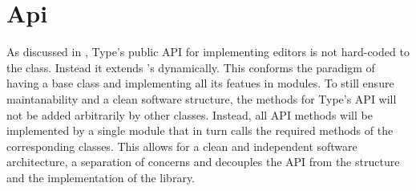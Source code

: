 




\section{Api}

As discussed in , Type's public API for implementing editors is not hard-coded to the  class. Instead it extends 's  dynamically. This conforms the paradigm of having a base class and implementing all its featues in modules. To still ensure maintanability and a clean software structure, the methods for Type's API will not be added arbitrarily by other classes. Instead, all API methods will be implemented by a single module that in turn calls the required methods of the corresponding classes. This allows for a clean and independent software architecture, a separation of concerns and decouples the API from the structure and the implementation of the library.

